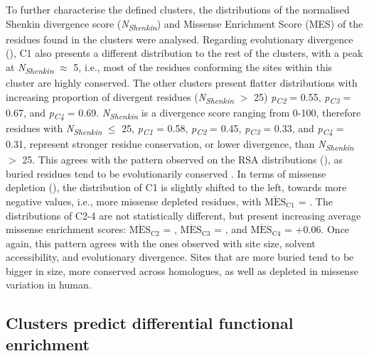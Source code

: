 To further characterise the defined clusters, the distributions of the normalised Shenkin divergence score (\textit{N\textsubscript{Shenkin}}) and Missense Enrichment Score (MES) of the residues found in the clusters were analysed. Regarding evolutionary divergence (), C1 also presents a different distribution to the rest of the clusters, with a peak at \textit{N\textsubscript{Shenkin}} $\approx$ 5, i.e., most of the residues conforming the sites within this cluster are highly conserved. The other clusters present flatter distributions with increasing proportion of divergent residues (\textit{N\textsubscript{Shenkin}} $>$ 25)  \textit{p\textsubscript{C2}} = 0.55,  \textit{p\textsubscript{C3}} = 0.67, and  \textit{p\textsubscript{C4}} = 0.69. \textit{N\textsubscript{Shenkin}} is a divergence score ranging from 0-100, therefore residues with \textit{N\textsubscript{Shenkin}} $\leq$ 25, \textit{p\textsubscript{C1}} = 0.58,  \textit{p\textsubscript{C2}} = 0.45,  \textit{p\textsubscript{C3}} = 0.33, and  \textit{p\textsubscript{C4}} = 0.31, represent stronger residue conservation, or lower divergence, than \textit{N\textsubscript{Shenkin}} $>$ 25. This agrees with the pattern observed on the RSA distributions (), as buried residues tend to be evolutionarily conserved \cite{RUSSELL_1994_UNCONSERVATION}. In terms of missense depletion (), the distribution of C1 is slightly shifted to the left, towards more negative values, i.e., more missense depleted residues, with $\overline{\text{MES}}_{\text{C1}}$ = . The distributions of C2-4 are not statistically different, but present increasing average missense enrichment scores: $\overline{\text{MES}}_{\text{C2}}$ = , $\overline{\text{MES}}_{\text{C3}}$ = , and $\overline{\text{MES}}_{\text{C4}}$ = +0.06. Once again, this pattern agrees with the ones observed with site size, solvent accessibility, and evolutionary divergence. Sites that are more buried tend to be bigger in size, more conserved across homologues, as well as depleted in missense variation in human.


\subsection{Clusters predict differential functional enrichment}

